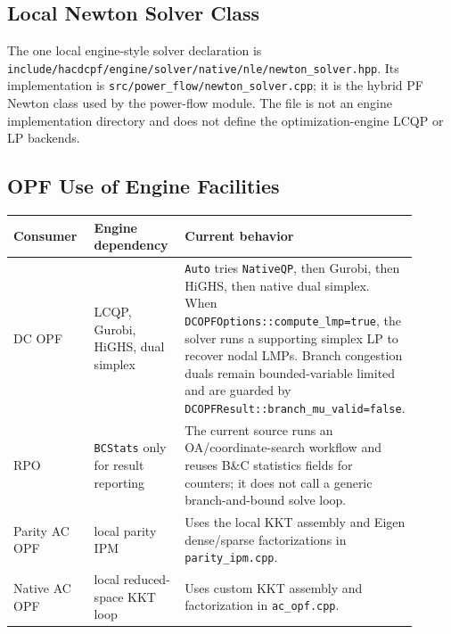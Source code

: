 \subsection{Local Newton Solver Class}

The one local engine-style solver declaration is
\texttt{include/hacdcpf/engine/solver/native/nle/newton\_solver.hpp}.  Its
implementation is \texttt{src/power\_flow/newton\_solver.cpp}; it is the hybrid
PF Newton class used by the power-flow module.  The file is not an engine
implementation directory and does not define the optimization-engine LCQP or LP
backends.

\subsection{OPF Use of Engine Facilities}

\begin{longtable}{L{0.24\linewidth}L{0.26\linewidth}L{0.40\linewidth}}
\toprule
Consumer & Engine dependency & Current behavior \\
\midrule
\endhead
DC OPF & LCQP, Gurobi, HiGHS, dual simplex & \texttt{Auto} tries \texttt{NativeQP}, then Gurobi, then HiGHS, then native dual simplex.  When \texttt{DCOPFOptions::compute\_lmp=true}, the solver runs a supporting simplex LP to recover nodal LMPs.  Branch congestion duals remain bounded-variable limited and are guarded by \texttt{DCOPFResult::branch\_mu\_valid=false}. \\
RPO & \texttt{BCStats} only for result reporting & The current source runs an OA/coordinate-search workflow and reuses B\&C statistics fields for counters; it does not call a generic branch-and-bound solve loop. \\
Parity AC OPF & local parity IPM & Uses the local KKT assembly and Eigen dense/sparse factorizations in \texttt{parity\_ipm.cpp}. \\
Native AC OPF & local reduced-space KKT loop & Uses custom KKT assembly and factorization in \texttt{ac\_opf.cpp}. \\
\bottomrule
\end{longtable}
